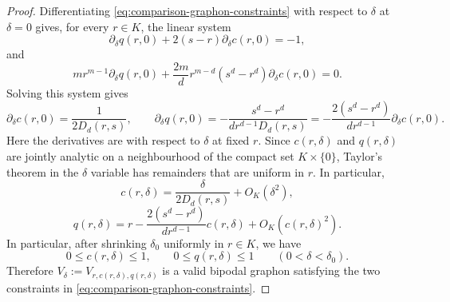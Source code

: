 \begin{proof}
Differentiating \eqref{eq:comparison-graphon-constraints} with respect to
$\delta$ at $\delta=0$ gives, for every $r\in K$, the linear system
\[
  \partial_\delta q(r,0)+2(s-r)\partial_\delta c(r,0)=-1,
\]
and
\[
  m r^{m-1}\partial_\delta q(r,0)
  +\frac{2m}{d}r^{m-d}(s^d-r^d)\partial_\delta c(r,0)=0.
\]
Solving this system gives
\[
  \partial_\delta c(r,0)=\frac1{2D_d(r,s)},
  \qquad
  \partial_\delta q(r,0)=-\frac{s^d-r^d}{d r^{d-1}D_d(r,s)}
  =-\frac{2(s^d-r^d)}{d r^{d-1}}\partial_\delta c(r,0).
\]
Here the derivatives are with respect to $\delta$ at fixed $r$.  Since
$c(r,\delta)$ and $q(r,\delta)$ are jointly analytic on a neighbourhood of the
compact set $K\times\{0\}$,
Taylor's theorem in the $\delta$ variable has remainders that are uniform in
$r$.  In particular,
\begin{equation}\label{eq:comparison-block-size}
  c(r,\delta)=\frac{\delta}{2D_d(r,s)}+O_K(\delta^2),
\end{equation}
\begin{equation}\label{eq:comparison-block-density}
  q(r,\delta)=
  r-\frac{2(s^d-r^d)}{d r^{d-1}}c(r,\delta)+O_K(c(r,\delta)^2).
\end{equation}
In particular, after shrinking $\delta_0$ uniformly in $r\in K$, we have
\[
  0\le c(r,\delta)\le1,
  \qquad
  0\le q(r,\delta)\le1
  \qquad (0<\delta<\delta_0).
\]
Therefore $V_\delta:=V_{r,c(r,\delta),q(r,\delta)}$ is a valid bipodal graphon
satisfying the two constraints in \eqref{eq:comparison-graphon-constraints}.


\end{proof}
